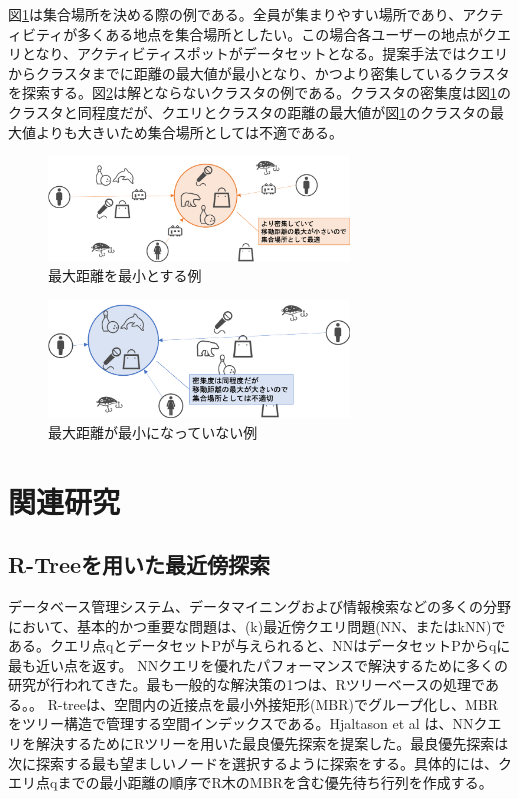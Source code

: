 \documentclass{deimj}
\begin{document}
図\ref{fig:ex-max1}は集合場所を決める際の例である。全員が集まりやすい場所であり、アクティビティが多くある地点を集合場所としたい。この場合各ユーザーの地点がクエリとなり、アクティビティスポットがデータセットとなる。提案手法ではクエリからクラスタまでに距離の最大値が最小となり、かつより密集しているクラスタを探索する。図\ref{fig:ex-max2}は解とならないクラスタの例である。クラスタの密集度は図\ref{fig:ex-max1}のクラスタと同程度だが、クエリとクラスタの距離の最大値が図\ref{fig:ex-max1}のクラスタの最大値よりも大きいため集合場所としては不適である。

\begin{figure}[H]
	\centering
    \includegraphics[width=8cm]{images/ex-max1.png}
    \caption{最大距離を最小とする例}
    \label{fig:ex-max1}
\end{figure}


\begin{figure}[H]
	\centering
    \includegraphics[width=8cm]{images/ex-max2.png}
    \caption{最大距離が最小になっていない例}
    \label{fig:ex-max2}
\end{figure}

\section{関連研究}

\subsection{R-Treeを用いた最近傍探索}
データベース管理システム、データマイニングおよび情報検索などの多くの分野において、基本的かつ重要な問題は、(k)最近傍クエリ問題(NN、またはkNN)である。クエリ点qとデータセットPが与えられると、NNはデータセットPからqに最も近い点を返す。 NNクエリを優れたパフォーマンスで解決するために多くの研究が行われてきた。最も一般的な解決策の1つは、Rツリーベースの処理である。\cite{cheung1998enhanced}\cite{hjaltason1999distance}。 R-tree\cite{R-tree}は、空間内の近接点を最小外接矩形(MBR)でグループ化し、MBRをツリー構造で管理する空間インデックスである。Hjaltason et al \cite{hjaltason1999distance}は、NNクエリを解決するためにRツリーを用いた最良優先探索を提案した。最良優先探索は次に探索する最も望ましいノードを選択するように探索をする。具体的には、クエリ点qまでの最小距離の順序でR木のMBRを含む優先待ち行列を作成する。
\end{document}
